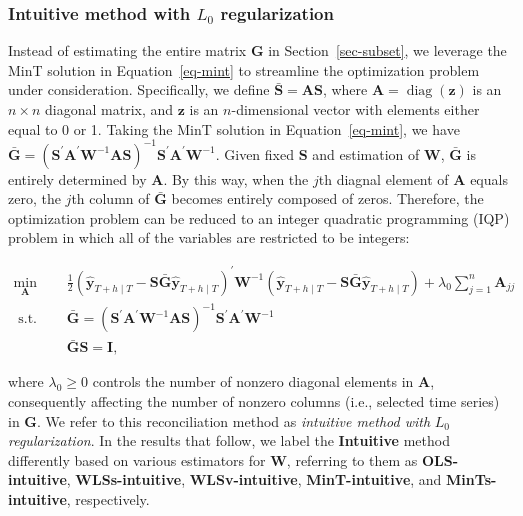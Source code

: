 \documentclass[11pt,a4paper,]{article}
\begin{document}
\hypertarget{sec-intuitive}{%
\subsubsection{\texorpdfstring{Intuitive method with \(L_0\)
regularization}{Intuitive method with L\_0 regularization}}\label{sec-intuitive}}

Instead of estimating the entire matrix \(\boldsymbol{G}\) in
Section~\ref{sec-subset}, we leverage the MinT solution in
Equation~\ref{eq-mint} to streamline the optimization problem under
consideration. Specifically, we define
\(\bar{\boldsymbol{S}} = \boldsymbol{A}\boldsymbol{S}\), where
\(\boldsymbol{A} = \operatorname{diag}(\boldsymbol{z})\) is an
\(n \times n\) diagonal matrix, and \(\boldsymbol{z}\) is an
\(n\)-dimensional vector with elements either equal to 0 or 1. Taking
the MinT solution in Equation~\ref{eq-mint}, we have
\(\bar{\boldsymbol{G}} = (\boldsymbol{S}^{\prime}\boldsymbol{A}^{\prime}\boldsymbol{W}^{-1}\boldsymbol{A}\boldsymbol{S})^{-1}\boldsymbol{S}^{\prime}\boldsymbol{A}^{\prime}\boldsymbol{W}^{-1}\).
Given fixed \(\boldsymbol{S}\) and estimation of \(\boldsymbol{W}\),
\(\bar{\boldsymbol{G}}\) is entirely determined by \(\boldsymbol{A}\).
By this way, when the \(j\)th diagnal element of \(\boldsymbol{A}\)
equals zero, the \(j\)th column of \(\bar{\boldsymbol{G}}\) becomes
entirely composed of zeros. Therefore, the optimization problem can be
reduced to an integer quadratic programming (IQP) problem in which all
of the variables are restricted to be integers:

\[
\begin{aligned}
\min _{\boldsymbol{A}} \quad & \frac{1}{2}\left(\hat{\boldsymbol{y}}_{T+h \mid T}-\boldsymbol{S}\bar{\boldsymbol{G}}\hat{\boldsymbol{y}}_{T+h \mid T}\right)^{\prime} \boldsymbol{W}^{-1}\left(\hat{\boldsymbol{y}}_{T+h \mid T}-\boldsymbol{S}\bar{\boldsymbol{G}}\hat{\boldsymbol{y}}_{T+h \mid T}\right) + \lambda_0 \sum_{j=1}^n \boldsymbol{A}_{jj} \\
\text { s.t. } \quad & \bar{\boldsymbol{G}} = (\boldsymbol{S}^{\prime}\boldsymbol{A}^{\prime}\boldsymbol{W}^{-1}\boldsymbol{A}\boldsymbol{S})^{-1}\boldsymbol{S}^{\prime}\boldsymbol{A}^{\prime}\boldsymbol{W}^{-1} \\
& \bar{\boldsymbol{G}}\boldsymbol{S} = \boldsymbol{I},
\end{aligned}
\]

where \(\lambda_0 \geq 0\) controls the number of nonzero diagonal
elements in \(\boldsymbol{A}\), consequently affecting the number of
nonzero columns (i.e., selected time series) in \(\boldsymbol{G}\). We
refer to this reconciliation method as \emph{intuitive method with}
\(L_0\) \emph{regularization}. In the results that follow, we label the
\textbf{Intuitive} method differently based on various estimators for
\(\boldsymbol{W}\), referring to them as \textbf{OLS-intuitive},
\textbf{WLSs-intuitive}, \textbf{WLSv-intuitive},
\textbf{MinT-intuitive}, and \textbf{MinTs-intuitive}, respectively.
\end{document}
